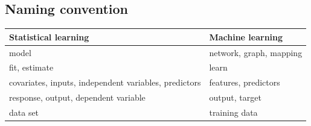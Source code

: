 \documentclass[]{article}
\begin{document}
\hypertarget{naming-convention}{%
\subsection{Naming convention}\label{naming-convention}}

\begin{longtable}[]{@{}ll@{}}
\toprule
\begin{minipage}[b]{0.47\columnwidth}\raggedright
Statistical learning\strut
\end{minipage} & \begin{minipage}[b]{0.47\columnwidth}\raggedright
Machine learning\strut
\end{minipage}\tabularnewline
\midrule
\endhead
\begin{minipage}[t]{0.47\columnwidth}\raggedright
model\strut
\end{minipage} & \begin{minipage}[t]{0.47\columnwidth}\raggedright
network, graph, mapping\strut
\end{minipage}\tabularnewline
\begin{minipage}[t]{0.47\columnwidth}\raggedright
fit, estimate\strut
\end{minipage} & \begin{minipage}[t]{0.47\columnwidth}\raggedright
learn\strut
\end{minipage}\tabularnewline
\begin{minipage}[t]{0.47\columnwidth}\raggedright
covariates, inputs, independent variables, predictors\strut
\end{minipage} & \begin{minipage}[t]{0.47\columnwidth}\raggedright
features, predictors\strut
\end{minipage}\tabularnewline
\begin{minipage}[t]{0.47\columnwidth}\raggedright
response, output, dependent variable\strut
\end{minipage} & \begin{minipage}[t]{0.47\columnwidth}\raggedright
output, target\strut
\end{minipage}\tabularnewline
\begin{minipage}[t]{0.47\columnwidth}\raggedright
data set\strut
\end{minipage} & \begin{minipage}[t]{0.47\columnwidth}\raggedright
training data\strut
\end{minipage}\tabularnewline
\bottomrule
\end{longtable}
\end{document}
